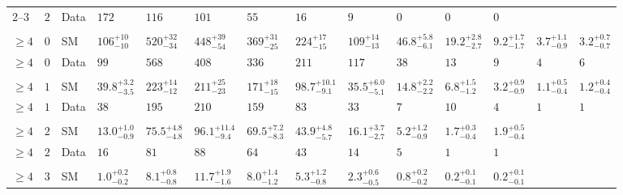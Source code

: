 \begin{landscape}
\begin{center}
\begin{table}[h!]
\begin{tabular}{ llllllllllllll }
    2--3                 & $2$      & Data & $172$                 & $116$                & $101$                 & $55$                 & $16$                  & $9$                  & $0$                  & $0$                  & $0$                  & \multicolumn{2}{c}{}                      \\ \\
    $\geq 4$             & $0$      & SM   & $106^{+10}_{-10}$     & $520^{+32}_{-34}$    & $448^{+39}_{-54}$     & $369^{+31}_{-25}$    & $224^{+17}_{-15}$     & $109^{+14}_{-13}$    & $46.8^{+5.8}_{-6.1}$ & $19.2^{+2.8}_{-2.7}$ & $9.2^{+1.7}_{-1.7}$  & $3.7^{+1.1}_{-0.9}$ & $3.2^{+0.7}_{-0.7}$ \\ 
    $\geq 4$             & $0$      & Data & $99$                  & $568$                & $408$                 & $336$                & $211$                 & $117$                & $38$                 & $13$                 & $9$                  & $4$                 & $6$                 \\\\
    $\geq 4$             & $1$      & SM   & $39.8^{+3.2}_{-3.5}$  & $223^{+14}_{-12}$    & $211^{+25}_{-23}$     & $171^{+18}_{-15}$    & $98.7^{+10.1}_{-9.1}$ & $35.5^{+6.0}_{-5.1}$ & $14.8^{+2.2}_{-2.2}$ & $6.8^{+1.5}_{-1.2}$  & $3.2^{+0.9}_{-0.9}$  & $1.1^{+0.5}_{-0.4}$ & $1.2^{+0.4}_{-0.4}$ \\ 
    $\geq 4$             & $1$      & Data & $38$                  & $195$                & $210$                 & $159$                & $83$                  & $33$                 & $7$                  & $10$                 & $4$                  & $1$                 & $1$                 \\\\
    $\geq 4$             & $2$      & SM   & $13.0^{+1.0}_{-0.9}$  & $75.5^{+4.8}_{-4.8}$ & $96.1^{+11.4}_{-9.4}$ & $69.5^{+7.2}_{-8.3}$ & $43.9^{+4.8}_{-5.7}$  & $16.1^{+3.7}_{-2.7}$ & $5.2^{+1.2}_{-0.9}$  & $1.7^{+0.3}_{-0.4}$  & $1.9^{+0.5}_{-0.4}$  & \multicolumn{2}{c}{}                      \\ 
    $\geq 4$             & $2$      & Data & $16$                  & $81$                 & $88$                  & $64$                 & $43$                  & $14$                 & $5$                  & $1$                  & $1$                  & \multicolumn{2}{c}{}                      \\\\ 
    $\geq 4$             & $3$      & SM   & $1.0^{+0.2}_{-0.2}$   & $8.1^{+0.8}_{-0.8}$  & $11.7^{+1.9}_{-1.6}$  & $8.0^{+1.4}_{-1.2}$  & $5.3^{+1.2}_{-0.8}$   & $2.3^{+0.6}_{-0.5}$  & $0.8^{+0.2}_{-0.2}$  & $0.2^{+0.1}_{-0.1}$  & $0.2^{+0.1}_{-0.1}$  & \multicolumn{2}{c}{}                      \\ 

\end{tabular}
\end{table}
\end{center}
\end{landscape}
